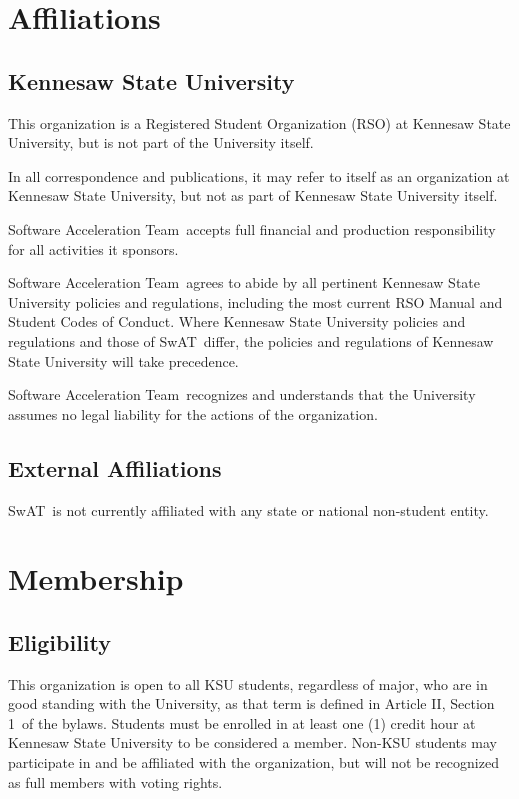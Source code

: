 \documentclass[12pt,letterpaper]{article} %
\newcommand{\org}{Software Acceleration Team}
\newcommand{\orgshort}{SwAT}
\newcommand{\bylawsGoodStanding}{Article II, Section 1}
\begin{document}
\section{Affiliations}\label{art:affiliations} %
\subsection{Kennesaw State University}\label{sec:ksu-affiliation} %
\begin{romanlist}
  \item This organization is a Registered Student Organization (RSO) at Kennesaw State
  University, but is not part of the University itself.
  \item In all correspondence and publications, it may refer to itself as an organization at
  Kennesaw State University, but not as part of Kennesaw State University itself.
  \item \org\ accepts full financial and production responsibility for all activities
  it sponsors.
  \item \org\ agrees to abide by all pertinent Kennesaw State University policies and
  regulations, including the most current RSO Manual and Student Codes of Conduct.
  Where Kennesaw State University policies and regulations and those of \orgshort\ differ,
  the policies and regulations of Kennesaw State University will take precedence.
  \item \org\ recognizes and understands that the University assumes no legal liability
  for the actions of the organization.
\end{romanlist}
\subsection{External Affiliations}\label{sec:external-affiliation}
\orgshort\ is not currently affiliated with any state or national non-student entity.

\section{Membership}\label{art:membership} %
\subsection{Eligibility}\label{sec:eligibility}
This organization is open to all KSU students, regardless of major, who are in good standing
with the University, as that term is defined in \bylawsGoodStanding\ of the bylaws.
Students must be enrolled in at least one (1) credit hour
at Kennesaw State University to be considered a member.
Non-KSU students may participate in and be affiliated with the organization,
but will not be recognized as full members with voting rights.
\end{document}
